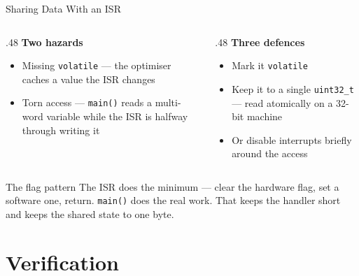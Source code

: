 \documentclass[9pt,aspectratio=169,xcolor=table]{beamer}
\begin{document}
\begin{frame}{Sharing Data With an ISR}
    \begin{columns}[T]
    \begin{column}{.48\textwidth}
        \textbf{Two hazards}
        {\small
        \begin{itemize}\itemsep1pt
            \item \alert{Missing \texttt{volatile}} --- the optimiser caches a
                  value the ISR changes
            \item \alert{Torn access} --- \texttt{main()} reads a multi-word
                  variable while the ISR is halfway through writing it
        \end{itemize}}
    \end{column}
    \begin{column}{.48\textwidth}
        \textbf{Three defences}
        {\small
        \begin{itemize}\itemsep1pt
            \item Mark it \texttt{volatile}
            \item Keep it to a single \texttt{uint32\_t} --- read atomically on a
                  32-bit machine
            \item Or disable interrupts \alert{briefly} around the access
        \end{itemize}}
    \end{column}
    \end{columns}

    \vspace{3mm}
    \begin{block}{The flag pattern}
        The ISR does the minimum --- clear the hardware flag, set a software one,
        return. \texttt{main()} does the real work. That keeps the handler short
        \alert{and} keeps the shared state to one byte.
    \end{block}
\end{frame}

\section{Verification}
\end{document}
